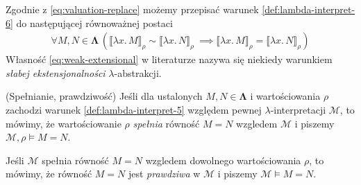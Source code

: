 Zgodnie z \eqref{eq:valuation-replace} możemy przepisać warunek \ref{def:lambda-interpret-6} do następującej równoważnej postaci
  \begin{align}
    \forall M,N\in\mathbf{\Lambda}\,\left(\llbracket\lambda x.\,M\rrbracket_\rho \sim \llbracket \lambda x.\,N\rrbracket_\rho\ \implies \llbracket \lambda x.\,M\rrbracket_\rho = \llbracket \lambda x.\,N\rrbracket_\rho\right)\tag{vi'}\label{eq:weak-extensional}
    \end{align}  
Własność \eqref{eq:weak-extensional} w literaturze nazywa się niekiedy warunkiem \emph{słabej ekstensjonalności} \(\lambda\)-abstrakcji.

  \begin{definicja}(Spełnianie, prawdziwość)
    Jeśli dla ustalonych \(M, N\in\mathbf{\Lambda}\) i wartościowania \(\rho\) zachodzi warunek \ref{def:lambda-interpret-5} względem pewnej \(\lambda\)-interpretacji \(\mathcal{M}\), to mówimy, że wartościowanie \(\rho\) \emph{spełnia} równość \(M=N\) wzgledem \(\mathcal{M}\) i piszemy \(\mathcal{M},\rho\models M=N\).

    Jeśli \(\mathcal{M}\) spełnia równość \(M=N\) wzgledem dowolnego wartościowania \(\rho\), to mówimy, że równość \(M=N\) jest \emph{prawdziwa} w \(\mathcal{M}\) i piszemy \(\mathcal{M}\models M=N\).
  \end{definicja}



